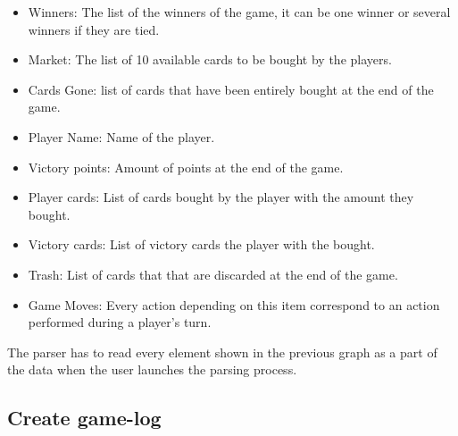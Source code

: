 \documentclass{scrreprt}
\begin{document}
\begin{itemize}
\item Winners: The list of the winners of the game, it can be one winner or several winners if they are tied.
\item Market: The list of 10 available cards to be bought by the players.
\item Cards Gone: list of cards that have been entirely bought at the end of the game.
\item Player Name: Name of the player.
\item Victory points: Amount of points at the end of the game.
\item Player cards: List of cards bought by the player with the amount they bought.
\item Victory cards: List of victory cards the player with the bought.
\item Trash: List of cards that that are discarded at the end of the game.
\item Game Moves: Every action depending on this item correspond to an action performed during a player's turn.
\end{itemize}
The parser has to read every element shown in the previous graph as a part of the data when the user launches the parsing process.\\

\subsection{Create game-log}
\end{document}
